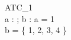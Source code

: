 \begin{schema}{ATC\_1}\\
 a : \nat ;
 b : \power \nat
\where
 a = 1 \\
 b = \{ 1, 2, 3, 4 \} \\
\end{schema}
